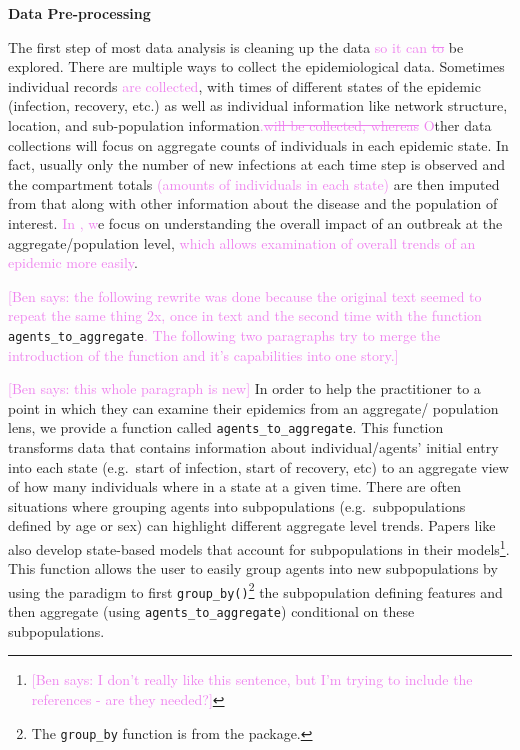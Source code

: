 \documentclass[
  shortnames]{jss}
\begin{document}
\textbf{Data Pre-processing}

The first step of most data analysis is cleaning up the data
\textcolor{violet}{so it can \sout{to}} be explored. There are multiple
ways to collect the epidemiological data. Sometimes individual records
\textcolor{violet}{are collected}, with times of different states of the
epidemic (infection, recovery, etc.) as well as individual information
like network structure, location, and sub-population
information\textcolor{violet}{.\sout{will be collected, whereas}}
\textcolor{violet}{O}ther data collections will focus on aggregate
counts of individuals in each epidemic state. In fact, usually only the
number of new infections at each time step is observed and the
compartment totals
\textcolor{violet}{(amounts of individuals in each state)} are then
imputed from that along with other information about the disease and the
population of interest. \textcolor{violet}{In , w}e
focus on understanding the overall impact of an outbreak at the
aggregate/population level,
\textcolor{violet}{which allows examination of overall trends of an epidemic more easily}.

\textcolor{violet}{[Ben says: the following rewrite was done because the original text seemed to repeat the same thing 2x, once in text and the second time with the function }\texttt{agents\_to\_aggregate}\textcolor{violet}{. The following two paragraphs try to merge the introduction of the function and it's capabilities into one story.]}

\textcolor{violet}{[Ben says: this whole paragraph is new]} In order to
help the practitioner to a point in which they can examine their
epidemics from an aggregate/ population lens, we provide a function
called \texttt{agents\_to\_aggregate}. This function transforms data
that contains information about individual/agents' initial entry into
each state (e.g.~start of infection, start of recovery, etc) to an
aggregate view of how many individuals where in a state at a given time.
There are often situations where grouping agents into subpopulations
(e.g.~subpopulations defined by age or sex) can highlight different
aggregate level trends. Papers like
\citet{rvachev1985,anderson1992,worby2015} also develop state-based
models that account for subpopulations in their
models\footnote{\textcolor{violet}{[Ben says: I don't really like this sentence, but I'm trying to include the references - are they needed?]}}.
This function allows the user to easily group agents into new
subpopulations by using the  paradigm to first
\texttt{group\_by()}\footnote{The \texttt{group\_by} function is from
  the  package.} the subpopulation defining features and then
aggregate (using \texttt{agents\_to\_aggregate}) conditional on these
subpopulations.
\end{document}
